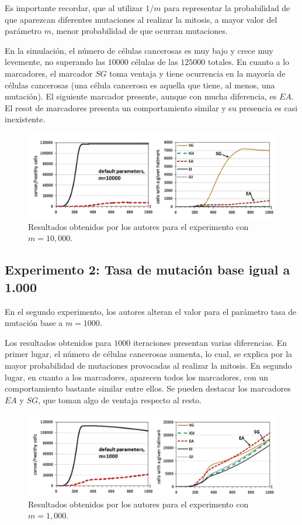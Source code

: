 Es importante recordar, que al utilizar $1/m$ para representar la probabilidad
de que aparezcan diferentes mutaciones al realizar la mitosis, a mayor valor
del parámetro $m$, menor probabilidad de que ocurran mutaciones.

En la simulación, el número de células cancerosas es muy bajo y crece muy levemente,
no superando las $10000$ células de las $125000$ totales. En cuanto a lo marcadores,
el marcador $SG$ toma ventaja y tiene ocurrencia en la mayoría de células cancerosas
(una célula cancerosa es aquella que tiene, al menos, una mutación). El siguiente marcador
presente, aunque con mucha diferencia, es $EA$. El resot de marcadores presenta
un comportamiento similar y su presencia es casi inexistente.

\begin{figure}[h]
\centering
\includegraphics[scale=0.6]{figures/experiments/exp1}
\caption{Resultados obtenidos por los autores para el experimento con $m=10,000$.}
\end{figure}

\subsection{Experimento 2: Tasa de mutación base igual a 1.000}

En el segundo experimento, los autores alteran el valor para el parámetro tasa de
mutación base a $m=1000$.

Los resultados obtenidos para $1000$ iteraciones presentan varias diferencias. En primer lugar,
el número de células cancerosas aumenta, lo cual, se explica por la mayor probabilidad
de mutaciones provocadas al realizar la mitosis. En segundo lugar, en cuanto a los marcadores,
aparecen todos los marcadores, con un comportamiento bastante similar entre ellos. Se pueden
destacar los marcadores $EA$ y $SG$, que toman algo de ventaja respecto al resto.

\begin{figure}[h]
\centering
\includegraphics[scale=0.6]{figures/experiments/exp2}
\caption{Resultados obtenidos por los autores para el experimento con $m=1,000$.}
\end{figure}

